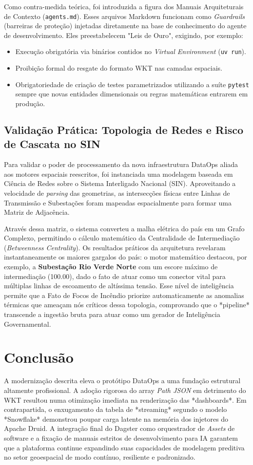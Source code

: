 \documentclass[12pt]{article}
\begin{document}
Como contra-medida teórica, foi introduzida a figura dos Manuais Arquiteturais de Contexto (\texttt{agents.md}). Esses arquivos Markdown funcionam como \textit{Guardrails} (barreiras de proteção) injetadas diretamente na base de conhecimento do agente de desenvolvimento. Eles preestabelecem "Leis de Ouro", exigindo, por exemplo:
\begin{itemize}
    \item Execução obrigatória via binários contidos no \textit{Virtual Environment} (\texttt{uv run}).
    \item Proibição formal do resgate do formato WKT nas camadas espaciais.
    \item Obrigatoriedade de criação de testes parametrizados utilizando a suíte \texttt{pytest} sempre que novas entidades dimensionais ou regras matemáticas entrarem em produção.
\end{itemize}

\subsection{Validação Prática: Topologia de Redes e Risco de Cascata no SIN}
Para validar o poder de processamento da nova infraestrutura DataOps aliada aos motores espaciais reescritos, foi instanciada uma modelagem baseada em Ciência de Redes sobre o Sistema Interligado Nacional (SIN). Aproveitando a velocidade de \textit{parsing} das geometrias, as intersecções físicas entre Linhas de Transmissão e Subestações foram mapeadas espacialmente para formar uma Matriz de Adjacência.

Através dessa matriz, o sistema converteu a malha elétrica do país em um Grafo Complexo, permitindo o cálculo matemático da Centralidade de Intermediação (\textit{Betweenness Centrality}). Os resultados práticos da arquitetura revelaram instantaneamente os maiores gargalos do país: o motor matemático destacou, por exemplo, a \textbf{Subestação Rio Verde Norte} com um escore máximo de intermediação (100.00), dado o fato de atuar como um conector vital para múltiplas linhas de escoamento de altíssima tensão. Esse nível de inteligência permite que a Fato de Focos de Incêndio priorize automaticamente as anomalias térmicas que ameaçam nós críticos dessa topologia, comprovando que o *pipeline* transcende a ingestão bruta para atuar como um gerador de Inteligência Governamental.

\section{Conclusão}
A modernização descrita eleva o protótipo DataOps a uma fundação estrutural altamente profissional. A adoção rigorosa do array \textit{Path JSON} em detrimento do WKT resultou numa otimização imediata na renderização das *dashboards*. Em contrapartida, o enxugamento da tabela de *streaming* segundo o modelo *Snowflake* demonstrou poupar carga latente na memória dos injetores do Apache Druid.
A integração final do Dagster como orquestrador de \textit{Assets} de software e a fixação de manuais estritos de desenvolvimento para IA garantem que a plataforma continue expandindo suas capacidades de modelagem preditiva no setor geoespacial de modo contínuo, resiliente e padronizado.



\end{document}
